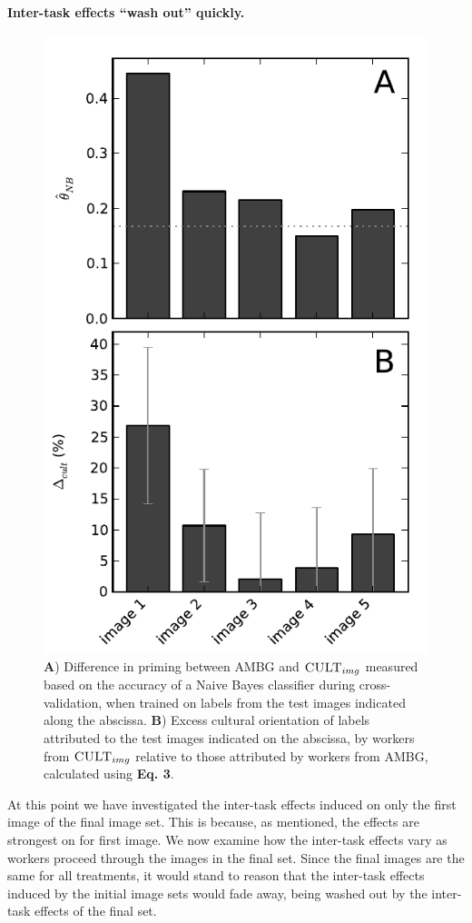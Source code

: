 \documentclass[a4paper]{report}
\begin{document}
\paragraph{Inter-task effects ``wash out'' quickly.}  
\begin{figure}
	\includegraphics[scale=0.7]{figs/longitudinal_theta_excess-culture.pdf}
	\caption{\footnotesize{
		\textbf{A}) Difference in priming between \textsc{AMBG} and 
		$\textsc{CULT}_{img}$ measured based on the accuracy of a Naive Bayes 
		classifier during cross-validation, when trained on labels from the
		test images indicated along the abscissa.
		\textbf{B}) Excess cultural orientation of labels attributed to
		the test images indicated on the abscissa, by workers from
		$\textsc{CULT}_{img}$ relative to those attributed by workers from
		\textsc{AMBG}, calculated using \textbf{Eq. 3}.
	}}
\end{figure}
At this point we have 
investigated the inter-task effects induced on only the first image of the 
final image set.  This is because, as mentioned, the effects are strongest on 
for first image.  We now examine how the inter-task effects vary as workers 
proceed through the images in the final set.  Since the final images are the
same for all treatments, it would stand to reason that the inter-task effects
induced by the initial image sets would fade away, being washed out by the
inter-task effects of the final set.
\end{document}
